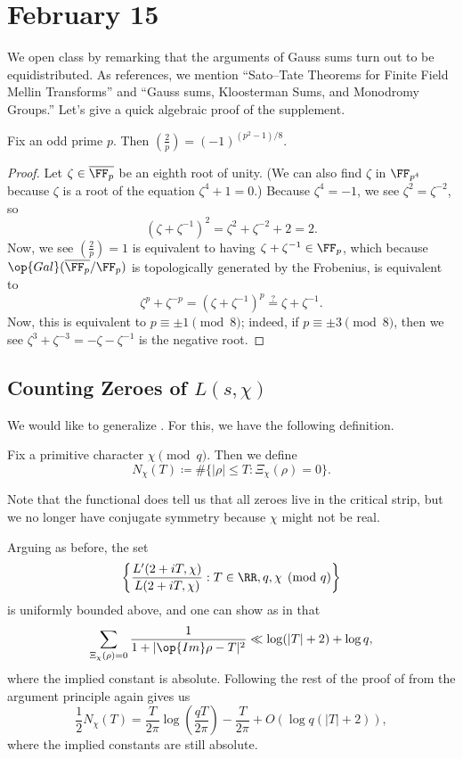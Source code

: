 \documentclass[../notes.tex]{subfiles}
\begin{document}
\section{February 15}

We open class by remarking that the arguments of Gauss sums turn out to be equidistributed. As references, we mention ``Sato--Tate Theorems for Finite Field Mellin Transforms'' and ``Gauss sums, Kloosterman Sums, and Monodromy Groups.'' Let's give a quick algebraic proof of the supplement.
\begin{proposition}
	Fix an odd prime $p$. Then $\left(\frac2p\right)=(-1)^{\left(p^2-1\right)/8}$.
\end{proposition}
\begin{proof}
	Let $\zeta\in\overline{\FF_p}$ be an eighth root of unity. (We can also find $\zeta$ in $\FF_{p^4}$ because $\zeta$ is a root of the equation $\zeta^4+1=0$.) Because $\zeta^4=-1$, we see $\zeta^2=\zeta^{-2}$, so
	\[\left(\zeta+\zeta^{-1}\right)^2=\zeta^2+\zeta^{-2}+2=2.\]
	Now, we see $\left(\frac2p\right)=1$ is equivalent to having $\zeta+\zeta^{-1}\in\FF_p$, which because $\op{Gal}(\overline{\FF_p}/\FF_p)$ is topologically generated by the Frobenius, is equivalent to
	\[\zeta^p+\zeta^{-p}=\left(\zeta+\zeta^{-1}\right)^p\stackrel?=\zeta+\zeta^{-1}.\] 
	Now, this is equivalent to $p\equiv\pm1\pmod8$; indeed, if $p\equiv\pm3\pmod8$, then we see $\zeta^3+\zeta^{-3}=-\zeta-\zeta^{-1}$ is the negative root.
\end{proof}

\subsection{Counting Zeroes of \texorpdfstring{$L(s,\chi)$}{ L(s, chi)}}
We would like to generalize . For this, we have the following definition.
\begin{notation}
	Fix a primitive character $\chi\pmod q$. Then we define
	\[N_\chi(T)\coloneqq\#\{|\rho|\le T:\Xi_\chi(\rho)=0\}.\]
\end{notation}
\begin{remark}
	Note that the functional  does tell us that all zeroes live in the critical strip, but we no longer have conjugate symmetry because $\chi$ might not be real.
\end{remark}
Arguing as before, the set
\[\left\{\frac{L'(2+iT,\chi)}{L(2+iT,\chi)}:T\in\RR,q,\chi\pmod q\right\}\]
is uniformly bounded above, and one can show as in  that
\[\sum_{\Xi_\chi(\rho)=0}\frac1{1+|\op{Im}\rho-T|^2}\ll\log(|T|+2)+\log q,\]
where the implied constant is absolute. Following the rest of the proof of  from the argument principle again gives us
\[\frac12N_\chi(T)=\frac T{2\pi}\log\left(\frac{qT}{2\pi}\right)-\frac T{2\pi}+O(\log q(|T|+2)),\]
where the implied constants are still absolute.
\end{document}
